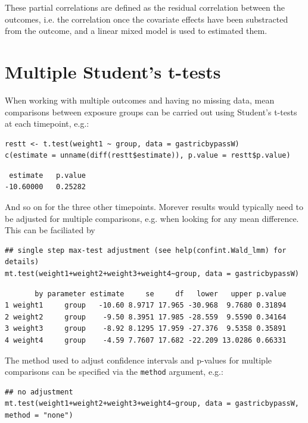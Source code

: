 \documentclass[12pt]{article}
\begin{document}
These partial correlations are defined as the residual correlation
between the outcomes, i.e. the correlation once the covariate effects
have been substracted from the outcome, and a linear mixed model is
used to estimated them.

\clearpage

\section{Multiple Student's t-tests}
\label{sec:orgabf9b00}

When working with multiple outcomes and having no missing data, mean
comparisons between exposure groups can be carried out using Student's
t-tests at each timepoint, e.g.:
\lstset{language=r,label= ,caption= ,captionpos=b,numbers=none}
\begin{lstlisting}
restt <- t.test(weight1 ~ group, data = gastricbypassW)
c(estimate = unname(diff(restt$estimate)), p.value = restt$p.value)
\end{lstlisting}

\begin{verbatim}
 estimate   p.value 
-10.60000   0.25282
\end{verbatim}


And so on for the three other timepoints. Morever results would
typically need to be adjusted for multiple comparisons, e.g. when
looking for any mean difference. This can be faciliated by
\lstset{language=r,label= ,caption= ,captionpos=b,numbers=none}
\begin{lstlisting}
## single step max-test adjustment (see help(confint.Wald_lmm) for details)
mt.test(weight1+weight2+weight3+weight4~group, data = gastricbypassW)
\end{lstlisting}

\begin{verbatim}
       by parameter estimate     se     df   lower   upper p.value
1 weight1     group   -10.60 8.9717 17.965 -30.968  9.7680 0.31894
2 weight2     group    -9.50 8.3951 17.985 -28.559  9.5590 0.34164
3 weight3     group    -8.92 8.1295 17.959 -27.376  9.5358 0.35891
4 weight4     group    -4.59 7.7607 17.682 -22.209 13.0286 0.66331
\end{verbatim}


The method used to adjust confidence intervals and p-values for
multiple comparisons can be specified via the \texttt{method} argument, e.g.:
\lstset{language=r,label= ,caption= ,captionpos=b,numbers=none}
\begin{lstlisting}
## no adjustment
mt.test(weight1+weight2+weight3+weight4~group, data = gastricbypassW, method = "none")
\end{lstlisting}
\end{document}
